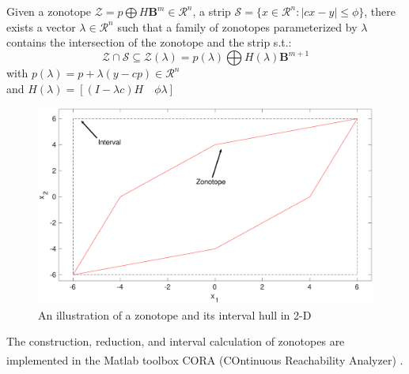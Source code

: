 \begin{lemma}\label{prop:intersect} \cite{Alamo2005}
Given a zonotope $\mathcal{Z} = p \bigoplus H\textbf{B}^m \in \mathcal{R}^n$,
 a strip $\mathscr{S} = \{x \in \mathcal{R}^n : |cx-y| \leq \phi\}$, there exists a vector $\lambda \in \mathcal{R}^n$ such that a family of zonotopes parameterized by $\lambda$ contains the intersection of the zonotope and the strip s.t.:
\begin{equation}
\mathcal{Z} \cap \mathscr{S} \subseteq \mathcal{Z}(\lambda) =  p(\lambda) \bigoplus H(\lambda) \textbf{B}^{m+1}
\end{equation} 
with $p(\lambda) = p + \lambda(y - cp) \in \mathcal{R}^n$ \\
and $H(\lambda) = [(I - \lambda c)H \quad \phi \lambda]$ 

\end{lemma}
\begin{figure}[!h]
\label{fig:zonotope}
\includegraphics[scale=1, width=\linewidth]{figures/zonotope}
\caption{An illustration of a zonotope and its interval hull in 2-D}
\end{figure}
The construction, reduction, and interval calculation of zonotopes are implemented in the Matlab\textsuperscript{\tiny\textregistered} toolbox CORA (COntinuous Reachability Analyzer) \cite{Althoff2018}.
